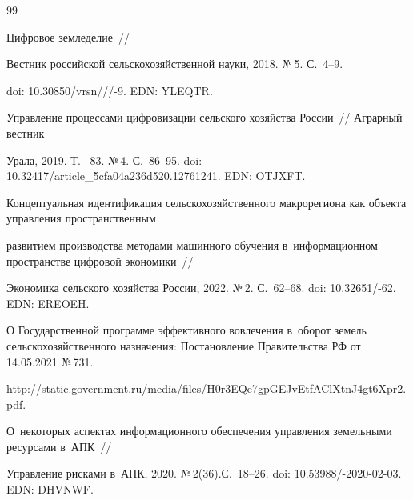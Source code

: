{\small\frenchspacing

{%


\begin{thebibliography}{99}


 Цифровое земледелие~/\!\!/ 

Вестник российской сельскохозяйственной науки, 2018. №\,5. С.~4--9. 

doi: 10.30850\!/\!vrsn\!/\!/\!/-9. EDN: YLEQTR.



 Управление процессами цифровизации сельского хозяйства России~/\!\!/ Аграрный вестник 

 Урала, 2019. Т. ~83. №\,4. С.~86--95. doi: 10.32417\!/\!article\_5cfa04a236d520.12761241. EDN: OTJXFT.



 Концептуальная идентификация сельскохозяйственного макрорегиона как объекта управления пространственным

  развитием производства методами машинного обучения в~информационном пространстве цифровой экономики~/\!\!/ 

  Экономика сельского хозяйства России, 2022. №\,2. С.~62--68. doi: 10.32651\!/-62. EDN: EREOEH.


О Государственной программе эффективного вовлечения в~оборот земель сельскохозяйственного назначения: Постановление Правительства РФ от 14.05.2021 №\,731. 

{\sf http://static.government.ru/media/files/H0r3EQe7gpGEJvEtfAClXtnJ4gt6Xpr2.pdf}.






 О~некоторых аспектах информационного обеспечения управ\-ле\-ния земельными ресурсами в~АПК~/\!\!/

 Управление рисками в~АПК, 2020. №\,2(36).С.~18--26. doi: 10.53988\!/-2020-02-03. EDN: DHVNWF.

 



\end{thebibliography}}}
